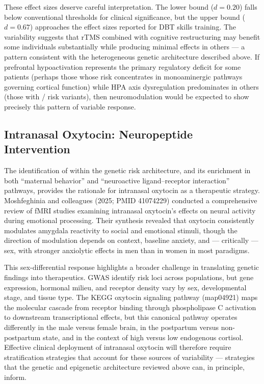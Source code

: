 These effect sizes deserve careful interpretation.
The lower bound ($d = 0.20$) falls below conventional thresholds for clinical
significance, but the upper bound ($d = 0.67$) approaches the effect sizes
reported for DBT skills training.
The variability suggests that rTMS combined with cognitive restructuring may
benefit some individuals substantially while producing minimal effects in
others — a pattern consistent with the heterogeneous genetic architecture
described above.
If prefrontal hypoactivation represents the primary regulatory deficit for
some patients (perhaps those whose risk concentrates in monoaminergic pathways
governing cortical function) while HPA axis dysregulation predominates in
others (those with / risk variants), then
neuromodulation would be expected to show precisely this pattern of variable
response.

\subsection*{Intranasal Oxytocin: Neuropeptide Intervention}

The identification of  within the genetic risk architecture, and its
enrichment in both ``maternal behavior'' and ``neuroactive ligand--receptor
interaction'' pathways, provides the rationale for intranasal oxytocin as a
therapeutic strategy.
Moshfeghinia and colleagues (2025; PMID 41074229) conducted a comprehensive
review of fMRI studies examining intranasal oxytocin's effects on neural
activity during emotional processing.
Their synthesis revealed that oxytocin consistently modulates amygdala
reactivity to social and emotional stimuli, though the direction of modulation
depends on context, baseline anxiety, and — critically — sex, with stronger
anxiolytic effects in men than in women in most paradigms.

This sex-differential response highlights a broader challenge in translating
genetic findings into therapeutics.
GWAS identify risk loci across populations, but gene expression, hormonal
milieu, and receptor density vary by sex, developmental stage, and tissue
type.
The KEGG oxytocin signaling pathway (map04921) maps the molecular cascade from
receptor binding through phospholipase C activation to downstream
transcriptional effects, but this canonical pathway operates differently in
the male versus female brain, in the postpartum versus non-postpartum state,
and in the context of high versus low endogenous cortisol.
Effective clinical deployment of intranasal oxytocin will therefore require
stratification strategies that account for these sources of variability —
strategies that the genetic and epigenetic architecture reviewed above can, in
principle, inform.

